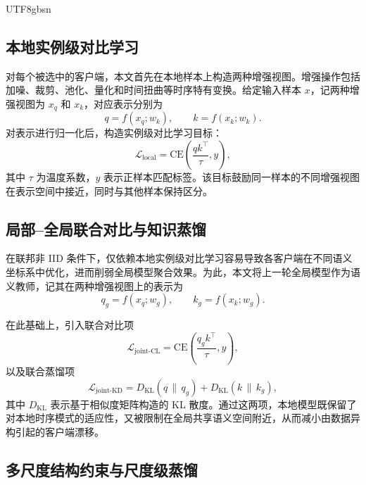 \documentclass{article}
\begin{document}
\begin{CJK*}{UTF8}{gbsn}
\subsection{本地实例级对比学习}

对每个被选中的客户端，本文首先在本地样本上构造两种增强视图。增强操作包括加噪、裁剪、池化、量化和时间扭曲等时序特有变换。给定输入样本 $x$，记两种增强视图为 $x_q$ 和 $x_k$，对应表示分别为
\begin{equation}
q = f(x_q;w_k),\qquad k = f(x_k;w_k).
\end{equation}
对表示进行归一化后，构造实例级对比学习目标：
\begin{equation}
\mathcal{L}_{\text{local}} = \mathrm{CE}\left(\frac{qk^\top}{\tau}, y\right),
\end{equation}
其中 $\tau$ 为温度系数，$y$ 表示正样本匹配标签。该目标鼓励同一样本的不同增强视图在表示空间中接近，同时与其他样本保持区分。

\subsection{局部--全局联合对比与知识蒸馏}

在联邦非 IID 条件下，仅依赖本地实例级对比学习容易导致各客户端在不同语义坐标系中优化，进而削弱全局模型聚合效果。为此，本文将上一轮全局模型作为语义教师，记其在两种增强视图上的表示为
\begin{equation}
q_g = f(x_q; w_g),\qquad k_g = f(x_k; w_g).
\end{equation}

在此基础上，引入联合对比项
\begin{equation}
\mathcal{L}_{\text{joint-CL}} = \mathrm{CE}\left(\frac{q_gk^\top}{\tau}, y\right),
\end{equation}
以及联合蒸馏项
\begin{equation}
\mathcal{L}_{\text{joint-KD}} = D_{\mathrm{KL}}(q \,\|\, q_g) + D_{\mathrm{KL}}(k \,\|\, k_g),
\end{equation}
其中 $D_{\mathrm{KL}}$ 表示基于相似度矩阵构造的 KL 散度。通过这两项，本地模型既保留了对本地时序模式的适应性，又被限制在全局共享语义空间附近，从而减小由数据异构引起的客户端漂移。

\subsection{多尺度结构约束与尺度级蒸馏}


\end{CJK*}
\end{document}
